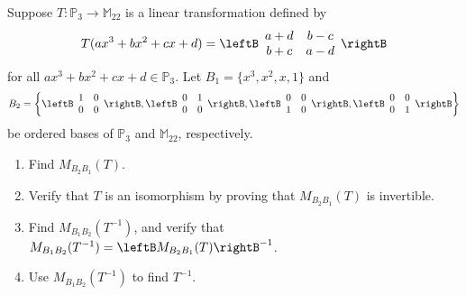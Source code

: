 \begin{example}{}
Suppose $T:\mathbb{P}_3\to\mathbb{M}_{22}$ is a linear transformation
defined by
\[ T(ax^3+bx^2+cx+d)=
\leftB\begin{array}{cc} a+d & b-c \\ b+c & a-d \end{array}\rightB\]
for all $ax^3+bx^2+cx+d\in\mathbb{P}_3$. Let
$B_1=\{ x^3, x^2, x, 1\}$ and
\[ B_2=\left\{
\leftB\begin{array}{cc} 1 & 0 \\ 0 & 0 \end{array}\rightB,
\leftB\begin{array}{cc} 0 & 1 \\ 0 & 0 \end{array}\rightB,
\leftB\begin{array}{cc} 0 & 0 \\ 1 & 0 \end{array}\rightB,
\leftB\begin{array}{cc} 0 & 0 \\ 0 & 1 \end{array}\rightB\right\}\]
be ordered bases of $\mathbb{P}_3$ and $\mathbb{M}_{22}$, respectively.
\begin{enumerate}
\item Find $M_{B_2B_1}(T)$.
\item Verify that $T$ is an isomorphism by proving that $M_{B_2B_1}(T)$
is invertible.
\item Find $M_{B_1B_2}(T^{-1})$, and verify that 
$M_{B_1B_2}(T^{-1}) = \leftB M_{B_2B_1}(T)\rightB^{-1}$.
\item Use $M_{B_1B_2}(T^{-1})$ to find $T^{-1}$.
\end{enumerate}
\end{example}

